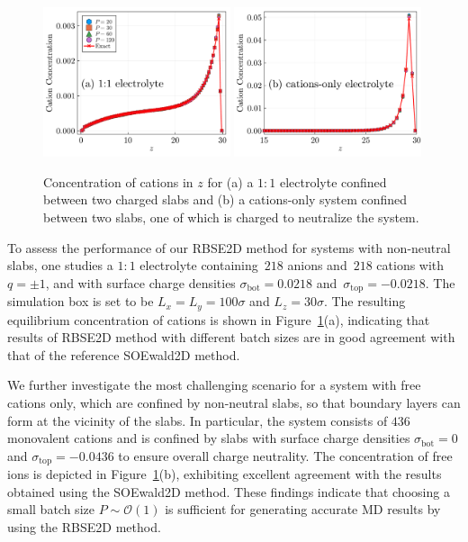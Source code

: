 \begin{figure}[ht]
	\centering
	\includegraphics[width=0.49\textwidth]{figs/hist_Ez.pdf} 
	\includegraphics[width=0.49\textwidth]{figs/hist_cation.pdf}
	\caption{
		Concentration of cations in $z$ for (a) a $1:1$ electrolyte confined between two charged slabs and (b) a cations-only system confined between two slabs, one of which is charged to neutralize the system. 
	}
	\label{fig:Ez_density}
\end{figure}


To assess the performance of our RBSE2D method for systems with non-neutral slabs, one studies
a $1:1$ electrolyte containing~$218$ anions and~$218$ cations with~$q = \pm 1$, and with surface charge densities $\sigma_{\mathrm{bot}}=0.0218$ and~$\sigma_{\mathrm{top}}=-0.0218$. The simulation box is set to be $L_x = L_y = 100 \sigma$ and $L_z = 30 \sigma$.
The resulting equilibrium concentration of cations is shown in Figure~\ref{fig:Ez_density}(a), indicating that results of RBSE2D method with different batch sizes are in good agreement with that of the reference SOEwald2D method. 

We further investigate the most challenging scenario for a system with free cations only, which are confined by non-neutral slabs, so that boundary layers can form at the vicinity of the slabs. 
In particular, the system consists of $436$ monovalent cations and is confined by slabs with surface charge densities $\sigma_{\mathrm{bot}}=0$ and $\sigma_{\mathrm{top}}=-0.0436$ to ensure overall charge neutrality. The concentration of free ions is depicted in Figure~\ref{fig:Ez_density}(b), exhibiting excellent agreement with the results obtained using the SOEwald2D method. 
These findings indicate that choosing a small batch size $P\sim\mathcal O(1)$ is sufficient for generating accurate MD results by using the RBSE2D method.

